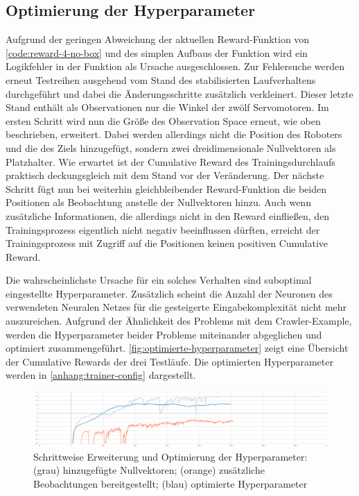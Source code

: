 \subsection{Optimierung der Hyperparameter}
Aufgrund der geringen Abweichung der aktuellen Reward-Funktion von \autoref{code:reward-4-no-box} und des simplen Aufbaus der Funktion wird ein Logikfehler in der Funktion als Ursache ausgeschlossen.
Zur Fehlersuche werden erneut Testreihen ausgehend vom Stand des stabilisierten Laufverhaltens durchgeführt und dabei die Änderungsschritte zusätzlich verkleinert.
Dieser letzte Stand enthält als Observationen nur die Winkel der zwölf Servomotoren.
Im ersten Schritt wird nun die Größe des Observation Space erneut, wie oben beschrieben, erweitert.
Dabei werden allerdings nicht die Position des Roboters und die des Ziels hinzugefügt, sondern zwei dreidimensionale Nullvektoren als Platzhalter.
Wie erwartet ist der Cumulative Reward des Trainingsdurchlaufs praktisch deckungsgleich mit dem Stand vor der Veränderung.
Der nächste Schritt fügt nun bei weiterhin gleichbleibender Reward-Funktion die beiden Positionen als Beobachtung anstelle der Nullvektoren hinzu.
Auch wenn zusätzliche Informationen, die allerdings nicht in den Reward einfließen, den Trainingsprozess eigentlich nicht negativ beeinflussen dürften, erreicht der Trainingsprozess mit Zugriff auf die Positionen keinen positiven Cumulative Reward.

Die wahrscheinlichste Ursache für ein solches Verhalten sind suboptimal eingestellte Hyperparameter.
Zusätzlich scheint die Anzahl der Neuronen des verwendeten Neuralen Netzes für die gesteigerte Eingabekomplexität nicht mehr auszureichen.
Aufgrund der Ähnlichkeit des Problems mit dem Crawler-Example, werden die Hyperparameter beider Probleme miteinander abgeglichen und optimiert zusammengeführt.
\autoref{fig:optimierte-hyperparameter} zeigt eine Übersicht der Cumulative Rewards der drei Testläufe.
Die optimierten Hyperparameter werden in \autoref{anhang:trainer-config} dargestellt.

\begin{figure}
    \centering
    \includegraphics[width = \textwidth]{Bilder/ml-agents/Environment_Cumulative Reward-add-observations.pdf}
    \caption[Schrittweise Erweiterung und Optimierung der Hyperparameter]{Schrittweise Erweiterung und Optimierung der Hyperparameter: (grau) hinzugefügte Nullvektoren; (orange) zusätzliche Beobachtungen bereitgestellt; (blau) optimierte Hyperparameter}
    \label{fig:optimierte-hyperparameter}
\end{figure}

